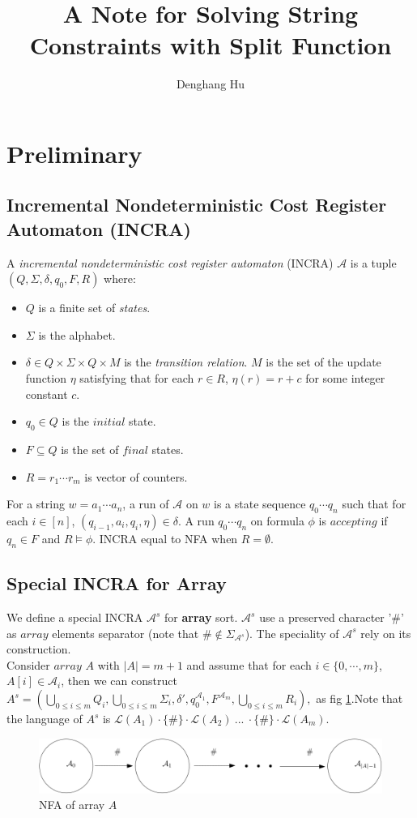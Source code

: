 \documentclass[12pt]{article}
\title{A Note for Solving String Constraints with Split Function}
\author{Denghang Hu}
\theoremstyle{remark}
\begin{document}
\maketitle

\section{Preliminary}
\subsection{Incremental Nondeterministic Cost Register Automaton (INCRA)}
A \textit{incremental nondeterministic cost register automaton} (INCRA) $\mathcal{A} $ is a tuple $(Q, \Sigma, \delta,q_0,F, R)$ where:
\begin{itemize}
    \item $Q$ is a finite set of \textit{states}.
    \item $\Sigma$ is the alphabet.
    \item $\delta\in Q\times\Sigma\times Q\times M$ is the \textit{transition relation}. $M$ is the set of the update function $\eta$ satisfying that for each $r\in R$, $\eta(r) = r+c$ for some integer constant $c$.
    \item $q_0\in Q$ is the $initial$ state.
    \item $F\subseteq Q$ is the set of $final$ states.
    \item $R = r_1\cdots r_m$ is vector of counters.
\end{itemize}
For a string $w=a_1\cdots a_n $, a run of $\mathcal{A}$ on $w$ is a state sequence $q_0\cdots q_n$ such that for each $i\in[n]$, $(q_{i-1},a_i,q_i,\eta)\in \delta$. A run $q_0\cdots q_n$ on formula $\phi$ is $accepting$ if $q_n \in F$ and $R\models \phi$. INCRA equal to NFA when $R=\emptyset$.
\subsection{Special INCRA for Array}
We define a special INCRA $\mathcal{A}^s$ for \textbf{array} sort. $\mathcal{A}^s$ use a preserved character '$\#$' as $array$ elements separator (note that $\#\not\in\Sigma_{\mathcal{A}^s}$). The speciality of $\mathcal{A}^s$ rely on  its construction.\\
Consider $array$ $A$ with $|A|=m+1$ and assume that for each $i\in\{0,\cdots, m\}$, $A[i]\in \mathcal{A}_i$, then we can construct $A^s=(\bigcup\limits_{0\leq i \leq m} Q_i,\bigcup\limits_{0\leq i \leq m} \Sigma_i, \delta', q_0^{\mathcal{A}_1}, F^{\mathcal{A}_m}, \bigcup\limits_{0\leq i \leq m} R_i), $ as fig \ref{fig:special_nfa}.Note that the language of $A^s$ is $\mathcal{L}(A_1)\cdot\{\#\}\cdot\mathcal{L}(A_2)\ ... \ \cdot\{\#\}\cdot \mathcal{L}(A_{m}) $.
\begin{figure}[H]
    \includegraphics[width=\linewidth]{special_nfa.png}
    \caption{NFA of array $A$}
    \label{fig:special_nfa}
\end{figure}
\end{document}
